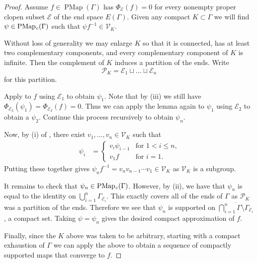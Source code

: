 \documentclass[10pt,a4paper]{amsart}
\def\G{{\Gamma}}
\DeclareMathOperator{\PMap}{PMap}
\DeclareMathOperator{\PMapc}{PMap_{\it c}}
\newcommand{\cE}{\mathcal{E}}
\newcommand{\cP}{\mathcal{P}}
\newcommand{\cV}{\mathcal{V}}
\begin{document}
\begin{proof}
    Assume $f \in \PMap(\G)$ has $\Phi_{\cE}(f) = 0$ for every nonempty proper clopen subset $\cE$ of the end space $E(\G)$. Given any compact $K \subset \G$ we will find $\psi \in \PMapc(\G)$ such that $\psi f^{-1} \in \cV_{K}$. 

    Without loss of generality we may enlarge $K$ so that it is connected, has at least two complementary components, and every complementary component of $K$ is infinite. Then the complement of $K$ induces a partition of the ends. Write 
    \[
    \cP_K = \cE_1 \sqcup \ldots \sqcup \cE_n
    \]
    for this partition.

    Apply  to $f$ using $\cE_{1}$ to obtain $\psi_{1}$. Note that by (iii) we still have $\Phi_{\cE_{2}}(\psi_{1}) = \Phi_{\cE_2}(f) = 0$. Thus we can apply the lemma again to $\psi_{1}$ using $\cE_{2}$ to obtain a $\psi_{2}$. Continue this process recursively to obtain $\psi_{n}$. 

    Now, by (i) of , there exist $v_1,\ldots,v_n \in \cV_K$ such that
    \begin{align*}
        \psi_{i} &=
        \begin{cases}
            v_i\psi_{i-1} & \text{for $1 < i \le n$,}\\
            v_1f & \text{for $i=1$}.
        \end{cases}
    \end{align*}
    Putting these together gives $\psi_{n}f^{-1} = v_{n}v_{n-1}\cdots v_{1} \in \cV_{K}$ as $\cV_{K}$ is a subgroup.

    It remains to check that $\psi_{n} \in \PMapc(\G)$. However, by (ii), we have that $\psi_{n}$ is equal to the identity on $\bigcup_{i=1}^{n}\G_{\cE_{i}}$. This exactly covers all of the ends of $\G$ as $\cP_{K}$ was a partition of the ends. Therefore we see that $\psi_{n}$ is supported on $\overline{\bigcap_{i=1}^{n} \G \setminus \G_{\cE_{i}}}$, a compact set. Taking $\psi = \psi_{n}$ gives the desired compact approximation of $f$. 

    Finally, since the $K$ above was taken to be arbitrary, starting with a compact exhaustion of $\G$ we can apply the above to obtain a sequence of compactly supported maps that converge to $f$. 
\end{proof}
\end{document}
